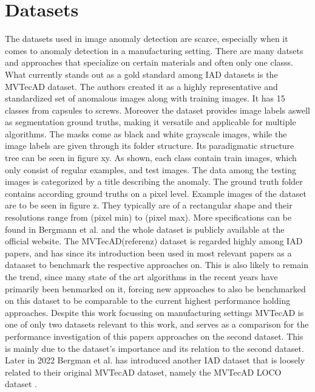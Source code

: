 \section{Datasets}
The datasets used in image anomaly detection are scarce, especially when it comes to anomaly detection in a manufacturing setting. There are many datsets and approaches that specialize on certain materials \cite{FabricDataset_Tsang_2016} 
\cite{SteeltubeDataset_Yang_2021} \cite{magnetictiles_Huang_2018}
and often only one classs. What currently stands out as a gold standard among IAD datasets is the MVTecAD \cite{MVTEC_Bergmann_2021} dataset. The authors created it  
as a highly representative and standardized set of anomalous images along with training images. It has 15 classes from capsules to screws. Moreover the dataset provides image labels aswell as segmentation 
ground truths, making it versatile and applicable for multiple algorithms. The masks come as black and white grayscale images, while the image labels are given through its folder structure. 
Its paradigmatic structure tree can be seen in figure xy. As shown, each class contain train images, which only consist of regular examples, 
and test images. The data among the testing images is categorized by a title describing the anomaly. The ground truth folder contains 
according ground truths on a pixel level. Example images of the dataset are to be seen in figure z. They typically are of a rectangular shape and their resolutions range from 
(pixel min) to (pixel max). More specifications can be found in Bergmann et al. \cite{MVTEC_Bergmann_2021} and the whole dataset is publicly available at the official website\cite{mvtecdownload}.\newline
The MVTecAD(referenz) dataset is regarded highly among IAD papers, and has since its introduction been used in most relevant papers as a dataaset 
to benchmark the respective approaches on. This is also likely to remain the trend, since many state of the art algorithms in the recent years have primarily been benmarked on it, forcing new approaches 
to also be benchmarked on this dataset to be comparable to the current highest performance holding approaches. Despite this work focussing on manufacturing settings MVTecAD is one of only two datasets relevant to this work, 
and serves as a comparison for the performance investigation of this papers approaches on the second dataset. This is mainly due to the dataset's importance and 
its relation to the second dataset.
\newline
Later in 2022 Bergman et al. has introduced another IAD dataset that is loosely related to their original MVTecAD dataset, namely the MVTecAD LOCO dataset \cite{LOCODentsAndScratchesBergmann2022}. 
